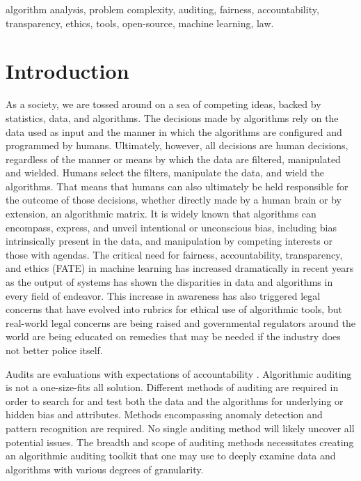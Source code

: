 \documentclass[conference]{IEEEtran}
\begin{document}
\begin{IEEEkeywords}
algorithm analysis, problem complexity, auditing, fairness, accountability, transparency, ethics, tools, open-source, machine learning, law.
\end{IEEEkeywords}

\section{Introduction}
As a society, we are tossed around on a sea of competing ideas, backed by statistics, data, and algorithms. The decisions made by algorithms rely on the data used as input and the manner in which the algorithms are configured and programmed by humans. Ultimately, however, all decisions are human decisions, regardless of the manner or means by which the data are filtered, manipulated and wielded. Humans select the filters, manipulate the data, and wield the algorithms. That means that humans can also ultimately be held responsible for the outcome of those decisions, whether directly made by a human brain or by extension, an algorithmic matrix.
It is widely known that algorithms can encompass, express, and unveil intentional or unconscious bias, including bias intrinsically present in the data, and manipulation by competing interests or those with agendas.
The critical need for fairness, accountability, transparency, and ethics (FATE) in machine learning has increased dramatically in recent years as the output of systems has shown the disparities in data and algorithms in every field of endeavor. This increase in awareness has also triggered legal concerns that have evolved into rubrics for ethical use of algorithmic tools, but real-world legal concerns are being raised and governmental regulators around the world are being educated on remedies that may be needed if the industry does not better police itself.

Audits are evaluations with expectations of accountability \cite{b1}. Algorithmic auditing is not a one-size-fits all solution. Different methods of auditing are required in order to search for and test both the data and the algorithms for underlying or hidden bias and attributes. Methods encompassing anomaly detection and pattern recognition are required. No single auditing method will likely uncover all potential issues. The breadth and scope of auditing methods necessitates creating an algorithmic auditing toolkit that one may use to deeply examine data and algorithms with various degrees of granularity.
\end{document}
